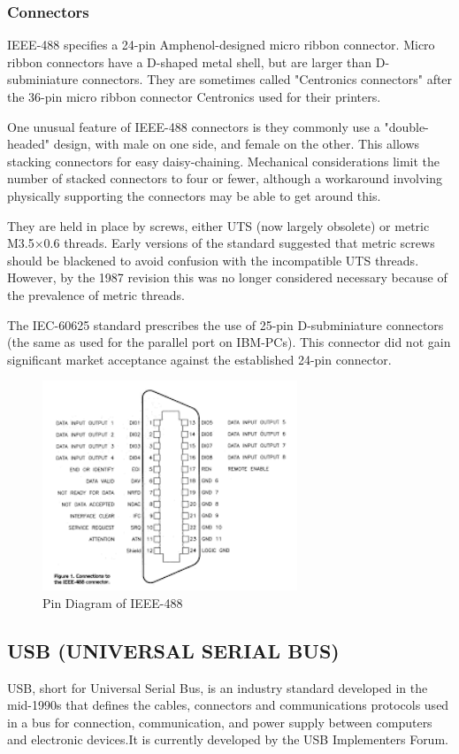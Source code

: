 \documentclass[12pt]{article}
\begin{document}
\subsubsection{Connectors}
IEEE-488 specifies a 24-pin Amphenol-designed micro ribbon connector. Micro ribbon connectors have a D-shaped metal shell, but are larger than D-subminiature connectors. They are sometimes called "Centronics connectors" after the 36-pin micro ribbon connector Centronics used for their printers.\par 

One unusual feature of IEEE-488 connectors is they commonly use a "double-headed" design, with male on one side, and female on the other. This allows stacking connectors for easy daisy-chaining. Mechanical considerations limit the number of stacked connectors to four or fewer, although a workaround involving physically supporting the connectors may be able to get around this.\par 

They are held in place by screws, either UTS (now largely obsolete) or metric M3.5×0.6 threads. Early versions of the standard suggested that metric screws should be blackened to avoid confusion with the incompatible UTS threads. However, by the 1987 revision this was no longer considered necessary because of the prevalence of metric threads.\par 

The IEC-60625 standard prescribes the use of 25-pin D-subminiature connectors (the same as used for the parallel port on IBM-PCs). This connector did not gain significant market acceptance against the established 24-pin connector.\par 
\begin{figure}[!h]
\includegraphics[width=3in]{images}
\caption{Pin Diagram of IEEE-488}
\centering
\end{figure}
\newpage
\subsection{USB (UNIVERSAL SERIAL BUS)}
USB, short for Universal Serial Bus, is an industry standard developed in the mid-1990s that defines the cables, connectors and communications protocols used in a bus for connection, communication, and power supply between computers and electronic devices.It is currently developed by the USB Implementers Forum.\par 
\end{document}
